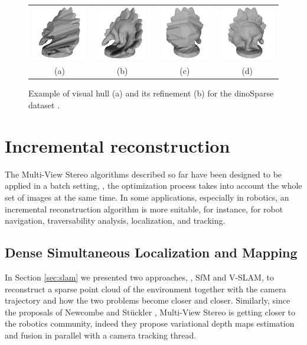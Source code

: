 \begin{figure}[t]
\centering
 \begin{tabular}{cccc}
  \includegraphics[width=0.2\columnwidth]{./img/ch_soa/dinoHull01}&
  \includegraphics[width=0.2\columnwidth]{./img/ch_soa/dinoRef01}&
  \includegraphics[width=0.2\columnwidth]{./img/ch_soa/dinoHull02}&
  \includegraphics[width=0.2\columnwidth]{./img/ch_soa/dinoRef02}\\
  (a)&(b)&(c)&(d)
 \end{tabular}
 \caption{Example of visual hull (a) and its refinement (b) for the dinoSparse dataset \cite{seitz_et_al06}.}
 \label{fig:visualhullex}
\end{figure}
\section{Incremental reconstruction} 
\label{sec:incr}
The Multi-View Stereo algorithms described so far have been designed to be applied in a batch setting, \ie, the optimization process takes into account the whole set of images at the same time.
In some applications, especially in robotics, an incremental reconstruction algorithm is more suitable, for instance, for robot navigation, traversability analysis, localization, and tracking.
\subsection{Dense Simultaneous Localization and Mapping}
In Section \ref{sec:slam} we presented two approaches, \ie, SfM and V-SLAM, to reconstruct a sparse point cloud of the environment together with the camera trajectory and how the two problems become closer and closer.
Similarly, since the proposals of Newcombe \etal \cite{newcombe2010live,newcombe2011kinectfusion,newcombe2011dtam} and St{\"u}ckler \etal \cite{stuhmer2010real}, Multi-View Stereo is getting closer to the robotics community, indeed they propose variational depth maps estimation and fusion in parallel with a camera tracking thread.

